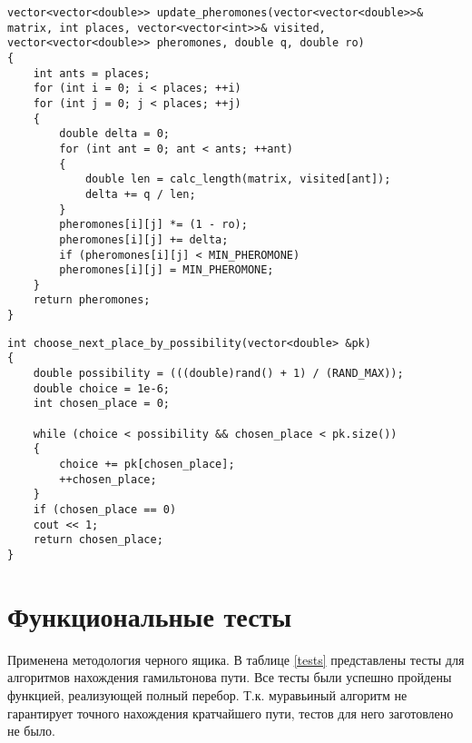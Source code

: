 \begin{center}
	\begin{lstlisting}[label=listing_pher,caption=алгоритм обновления матрицы феромонов]
vector<vector<double>> update_pheromones(vector<vector<double>>& matrix, int places, vector<vector<int>>& visited, vector<vector<double>> pheromones, double q, double ro)
{
	int ants = places;
	for (int i = 0; i < places; ++i)
	for (int j = 0; j < places; ++j)
	{
		double delta = 0;
		for (int ant = 0; ant < ants; ++ant)
		{
			double len = calc_length(matrix, visited[ant]);
			delta += q / len;
		}
		pheromones[i][j] *= (1 - ro);
		pheromones[i][j] += delta;
		if (pheromones[i][j] < MIN_PHEROMONE)
		pheromones[i][j] = MIN_PHEROMONE;
	}
	return pheromones;
}
	\end{lstlisting}
\end{center}

\clearpage

\begin{center}
	\begin{lstlisting}[label=lst:end,caption=Алгоритм выбора следующего города]
int choose_next_place_by_possibility(vector<double> &pk)
{
	double possibility = (((double)rand() + 1) / (RAND_MAX));
	double choice = 1e-6;
	int chosen_place = 0;
	
	while (choice < possibility && chosen_place < pk.size())
	{
		choice += pk[chosen_place];
		++chosen_place;
	}
	if (chosen_place == 0)
	cout << 1;
	return chosen_place;
}
	\end{lstlisting}
\end{center}

\section{Функциональные тесты}

Применена методология черного ящика. В таблице \ref{tests} представлены тесты для алгоритмов нахождения гамильтонова пути. 
Все тесты были успешно пройдены функцией, реализующей полный перебор. Т.к. муравьиный алгоритм не гарантирует точного нахождения кратчайшего пути, тестов для него заготовлено не было.

